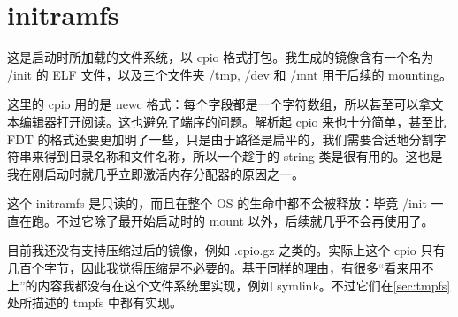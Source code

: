 \section{initramfs}
\label{sec:initramfs}

这是启动时所加载的文件系统，以 cpio 格式打包。我生成的镜像含有一个名为 /init 的 ELF 文件，以及三个文件夹 /tmp, /dev 和 /mnt 用于后续的 mounting。

这里的 cpio 用的是 newc 格式\cite{cpionewc}：每个字段都是一个字符数组，所以甚至可以拿文本编辑器打开阅读。这也避免了端序的问题。解析起 cpio 来也十分简单，甚至比 FDT 的格式还要更加明了一些，只是由于路径是扁平的，我们需要合适地分割字符串来得到目录名称和文件名称，所以一个趁手的 string 类是很有用的。这也是我在刚启动时就几乎立即激活内存分配器的原因之一。

这个 initramfs 是只读的，而且在整个 OS 的生命中都不会被释放：毕竟 /init 一直在跑。不过它除了最开始启动时的 mount 以外，后续就几乎不会再使用了。

目前我还没有支持压缩过后的镜像，例如 .cpio.gz 之类的。实际上这个 cpio 只有几百个字节，因此我觉得压缩是不必要的。基于同样的理由，有很多“看来用不上”的内容我都没有在这个文件系统里实现，例如 symlink。不过它们在\cref{sec:tmpfs}处所描述的 tmpfs 中都有实现。
